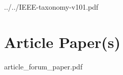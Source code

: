 	
	{../../IEEE-taxonomy-v101.pdf}
	\cleardoublepage
	
	\ifPubList
	
	\fi
	\cleardoublepage
	
	\ifVita
	
	\fi
	\cleardoublepage
	
	\ifIndex
	\printindex
	\fi
	
	\chapter{Article Paper(s)} 
	\label{ch:article_paper}
	\cleardoublepage
	{
	\ClearWallPaper
	
	{article_forum_paper.pdf}
	}
	\cleardoublepage

